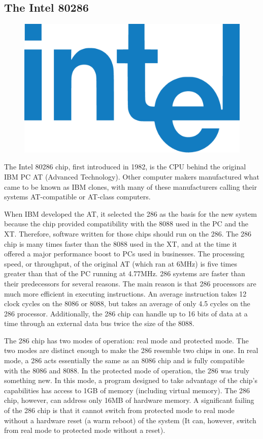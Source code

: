 \documentclass[book.tex]{subfiles}
\begin{document}
\subsection{The Intel 80286}
  \begin{figure}
\centering
\vspace{-10pt}
\includegraphics[width=.3\textwidth]{imgs/drawings/intel_logo.eps}
\end{figure}
\par
The Intel 80286 chip, first introduced in 1982, is the CPU behind the original IBM PC AT (Advanced Technology). Other computer makers manufactured what came to be known as IBM clones, with many of these manufacturers calling their systems AT-compatible or AT-class computers. \\
\par
When IBM developed the AT, it selected the 286 as the basis for the new system because the chip provided compatibility with the 8088 used in the PC and the XT. Therefore, software written for those chips should run on the 286. The 286 chip is many times faster than the 8088 used in the XT, and at the time it offered a major performance boost to PCs used in businesses. The processing speed, or throughput, of the original AT (which ran at 6MHz) is five times greater than that of the PC running at 4.77MHz.
286 systems are faster than their predecessors for several reasons. The main reason is that 286 processors are much more efficient in executing instructions. An average instruction takes 12 clock cycles on the 8086 or 8088, but takes an average of only 4.5 cycles on the 286 processor. Additionally, the 286 chip can handle up to 16 bits of data at a time through an external data bus twice the size of the 8088.\\
\par
The 286 chip has two modes of operation: real mode and protected mode. The two modes are distinct enough to make the 286 resemble two chips in one. In real mode, a 286 acts essentially the same as an 8086 chip and is fully compatible with the 8086 and 8088. In the protected mode of operation, the 286 was truly something new. In this mode, a program designed to take advantage of the chip's capabilities has access to 1GB of memory (including virtual memory). The 286 chip, however, can address only 16MB of hardware memory. A significant failing of the 286 chip is that it cannot switch from protected mode to real mode without a hardware reset (a warm reboot) of the system (It can, however, switch from real mode to protected mode without a reset).\\
\end{document}
